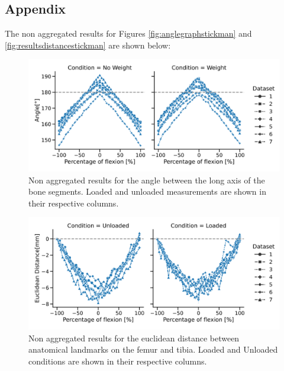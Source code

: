 \documentclass{micro-econ-thesis}
\begin{document}
\cleardoublepage
\begin{appendix}
\section{Appendix}

The non aggregated results for Figures \ref{fig:anglegraphstickman} and \ref{fig:resultsdistancestickman} are shown below: 
\begin{figure}[H]
	\centering
	\includegraphics[scale=0.42]{angle_non_agg}
	\caption{Non aggregated results for the angle between the long axis of the bone segments. Loaded and unloaded measurements are shown in their respective columns.}
	\label{fig:anglenonagg}
\end{figure}

\begin{figure}[H]
	\centering
	\includegraphics[scale=0.42]{norm_non_agg}
	\caption{Non aggregated results for the euclidean distance between anatomical landmarks on the femur and tibia. Loaded and Unloaded conditions are shown in their respective columns.}
	\label{fig:normnonagg}
\end{figure}




\end{appendix}

\makeThesisDeclaration
\end{document}
